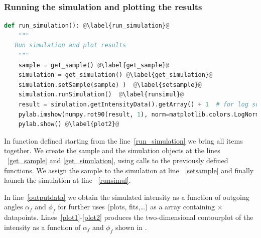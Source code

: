 \subsubsection{Running the simulation  and
  plotting the results}

\begin{lstlisting}[language=python, style=eclipseboxed,name=ex1,nolol]
def run_simulation(): @\label{run_simulation}@
    """
   Run simulation and plot results
    """
    sample = get_sample() @\label{get_sample}@
    simulation = get_simulation() @\label{get_simulation}@
    simulation.setSample(sample) )  @\label{setsample}@
    simulation.runSimulation()  @\label{runsimul}@
    result = simulation.getIntensityData().getArray() + 1  # for log scale  @\label{outputdata}@
    pylab.imshow(numpy.rot90(result, 1), norm=matplotlib.colors.LogNorm(), extent=[-1.0, 1.0, 0, 2.0]) @\label{plot1}@
    pylab.show() @\label{plot2}@
\end{lstlisting}
In function defined starting from the line~\ref{run_simulation} we bring all
items together. We create the sample and the simulation objects at the lines 
~\ref{get_sample} and \ref{get_simulation}, using calls to the previously defined functions. We assign the sample to the simulation at line ~\ref{setsample} and
finally launch the simulation at line ~\ref{runsimul}.

In line~\ref{outputdata} we obtain the simulated intensity
as a function of outgoing angles $\alpha_f$ and $\phi_f$ for further
uses (plots, fits,\ldots) as a  array containing
$\times$
datapoints. Lines~\ref{plot1}-\ref{plot2} produces the two-dimensional
contourplot of the intensity as a function of $\alpha_f$ and
$\phi_f$ shown in . 


